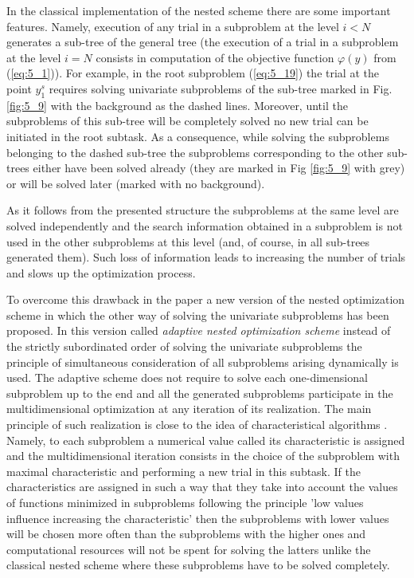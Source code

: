 In the classical implementation of the nested scheme there are some important features. Namely, execution of any trial in a subproblem at the level $i<N$ generates a sub-tree of the general tree (the execution of a trial in a subproblem at the level $i=N$ consists in computation of the objective function $\varphi(y)$ from (\ref{eq:5_1})). For example, in the root subproblem (\ref{eq:5_19})  the trial at the point $y_1^s$  requires solving univariate subproblems of the sub-tree marked in Fig.\ref{fig:5_9} with the background as the dashed lines. Moreover, until the subproblems of this sub-tree will be completely solved no new trial can be initiated in the root subtask. As a consequence, while solving the subproblems belonging to the dashed sub-tree the subproblems corresponding to the other sub-trees either have been solved already (they are marked in Fig \ref{fig:5_9} with grey) or will be solved later (marked with no background).

As it follows from the presented structure the subproblems at the same level are solved independently and the search information obtained in a subproblem is not used in the other subproblems at this level (and, of course, in all sub-trees generated them).  Such loss of information leads to increasing the number of trials and slows up the optimization process. 

To overcome this drawback in the paper \cite{5_GerGriGer} a new version of the nested optimization scheme in which the other way of solving the univariate subproblems has been proposed. In this version called \textit{adaptive nested optimization scheme} instead of the strictly subordinated order of solving the univariate subproblems the principle of simultaneous consideration of all subproblems arising dynamically is used. The adaptive scheme does not require to solve each  one-dimensional subproblem  up to the end and all the generated subproblems participate in the multidimensional optimization at any iteration of its realization. The main principle of such realization is close to the idea of characteristical algorithms  \cite{5_GriKvaMukhStr, 5_GrishaginSergeyevStrongin}. Namely, to each subproblem a numerical value called its characteristic is assigned and the multidimensional iteration consists in the choice of the subproblem with maximal characteristic and performing a new trial in this subtask. If the characteristics are assigned in such a way that they take into account the values of functions minimized in subproblems following the principle 'low values influence increasing the characteristic' then the subproblems with lower values will be chosen more often than the subproblems with the higher ones and computational resources will not be spent for solving the latters unlike the classical nested scheme where these subproblems have to be solved completely. 

